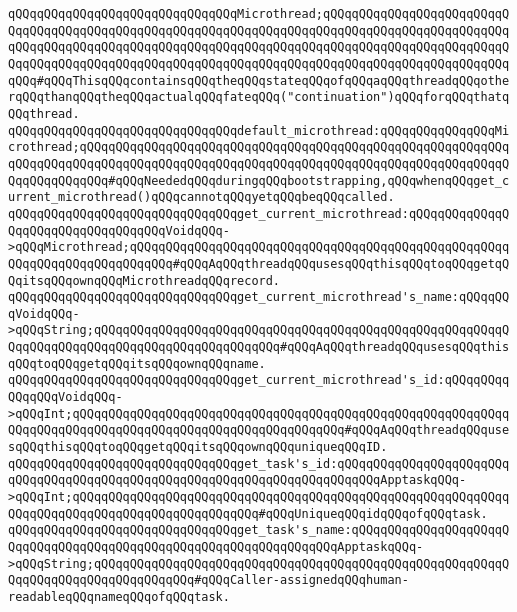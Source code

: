 \verb|qQQqqQQqqQQqqQQqqQQqqQQqqQQqqQQqMicrothread;qQQqqQQqqQQqqQQqqQQqqQQqqQQqqQQqqQQqqQQqqQQqqQQqqQQqqQQqqQQqqQQqqQQqqQQqqQQqqQQqqQQqqQQqqQQqqQQqqQQqqQQqqQQqqQQqqQQqqQQqqQQqqQQqqQQqqQQqqQQqqQQqqQQqqQQqqQQqqQQqqQQqqQQqqQQqqQQqqQQqqQQqqQQqqQQqqQQqqQQqqQQqqQQqqQQqqQQqqQQqqQQqqQQqqQQqqQQqqQQq#qQQqThisqQQqcontainsqQQqtheqQQqstateqQQqofqQQqaqQQqthreadqQQqotherqQQqthanqQQqtheqQQqactualqQQqfateqQQq("continuation")qQQqforqQQqthatqQQqthread.|\newline
\newline
\verb|qQQqqQQqqQQqqQQqqQQqqQQqqQQqqQQqdefault_microthread:qQQqqQQqqQQqqQQqMicrothread;qQQqqQQqqQQqqQQqqQQqqQQqqQQqqQQqqQQqqQQqqQQqqQQqqQQqqQQqqQQqqQQqqQQqqQQqqQQqqQQqqQQqqQQqqQQqqQQqqQQqqQQqqQQqqQQqqQQqqQQqqQQqqQQqqQQqqQQqqQQqqQQq#qQQqNeededqQQqduringqQQqbootstrapping,qQQqwhenqQQqget_current_microthread()qQQqcannotqQQqyetqQQqbeqQQqcalled.|\newline
\newline
\verb|qQQqqQQqqQQqqQQqqQQqqQQqqQQqqQQqget_current_microthread:qQQqqQQqqQQqqQQqqQQqqQQqqQQqqQQqqQQqVoidqQQq->qQQqMicrothread;qQQqqQQqqQQqqQQqqQQqqQQqqQQqqQQqqQQqqQQqqQQqqQQqqQQqqQQqqQQqqQQqqQQqqQQqqQQq#qQQqAqQQqthreadqQQqusesqQQqthisqQQqtoqQQqgetqQQqitsqQQqownqQQqMicrothreadqQQqrecord.|\newline
\verb|qQQqqQQqqQQqqQQqqQQqqQQqqQQqqQQqget_current_microthread's_name:qQQqqQQqVoidqQQq->qQQqString;qQQqqQQqqQQqqQQqqQQqqQQqqQQqqQQqqQQqqQQqqQQqqQQqqQQqqQQqqQQqqQQqqQQqqQQqqQQqqQQqqQQqqQQqqQQqqQQq#qQQqAqQQqthreadqQQqusesqQQqthisqQQqtoqQQqgetqQQqitsqQQqownqQQqname.|\newline
\verb|qQQqqQQqqQQqqQQqqQQqqQQqqQQqqQQqget_current_microthread's_id:qQQqqQQqqQQqqQQqVoidqQQq->qQQqInt;qQQqqQQqqQQqqQQqqQQqqQQqqQQqqQQqqQQqqQQqqQQqqQQqqQQqqQQqqQQqqQQqqQQqqQQqqQQqqQQqqQQqqQQqqQQqqQQqqQQqqQQqqQQq#qQQqAqQQqthreadqQQqusesqQQqthisqQQqtoqQQqgetqQQqitsqQQqownqQQquniqueqQQqID.|\newline
\newline
\verb|qQQqqQQqqQQqqQQqqQQqqQQqqQQqqQQqget_task's_id:qQQqqQQqqQQqqQQqqQQqqQQqqQQqqQQqqQQqqQQqqQQqqQQqqQQqqQQqqQQqqQQqqQQqqQQqqQQqApptaskqQQq->qQQqInt;qQQqqQQqqQQqqQQqqQQqqQQqqQQqqQQqqQQqqQQqqQQqqQQqqQQqqQQqqQQqqQQqqQQqqQQqqQQqqQQqqQQqqQQqqQQqqQQq#qQQqUniqueqQQqidqQQqofqQQqtask.|\newline
\verb|qQQqqQQqqQQqqQQqqQQqqQQqqQQqqQQqget_task's_name:qQQqqQQqqQQqqQQqqQQqqQQqqQQqqQQqqQQqqQQqqQQqqQQqqQQqqQQqqQQqqQQqqQQqApptaskqQQq->qQQqString;qQQqqQQqqQQqqQQqqQQqqQQqqQQqqQQqqQQqqQQqqQQqqQQqqQQqqQQqqQQqqQQqqQQqqQQqqQQqqQQqqQQq#qQQqCaller-assignedqQQqhuman-readableqQQqnameqQQqofqQQqtask.|\newline
